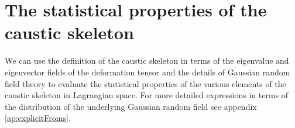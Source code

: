 \documentclass[a4paper, 11pt]{article}
\begin{document}
\section{The statistical properties of the caustic skeleton}\label{sec:causticSkeleton}
We can use the definition of the caustic skeleton in terms of the eigenvalue and eigenvector fields of the deformation tensor and the details of Gaussian random field theory to evaluate the statistical properties of the various elements of the caustic skeleton in Lagrangian space. For more detailed expressions in terms of the distribution of the underlying Gaussian random field see appendix \ref{ap:explicitFroms}.




\end{document}
